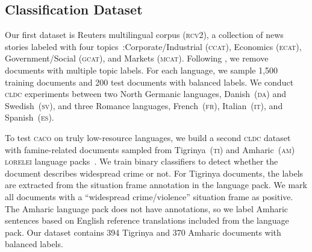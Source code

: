 \documentclass[letterpaper]{article} %
\newcommand{\citet}[1]{\citeauthor{#1} \shortcite{#1}}
\newcommand{\citep}{\cite}
\newcommand{\abr}[1]{\textsc{#1}}
\newcommand{\name}[0]{\textsc{caco}}
\begin{document}
\subsection{Classification Dataset} 

Our first dataset is Reuters multilingual corpus (\abr{rcv2}), a collection of
news stories labeled with four topics~\citep{lewis-04}:Corporate/Industrial
(\abr{ccat}), Economics (\abr{ecat}), Government/Social (\abr{gcat}), and
Markets (\abr{mcat}).
Following \citet{klementiev-12}, we remove documents with multiple topic
labels.  For each language, we sample 1,500 training documents and 200 test
documents with balanced labels.  We conduct \abr{cldc} experiments between two
North Germanic languages, Danish~(\abr{da}) and Swedish~(\abr{sv}), and three
Romance languages, French~(\abr{fr}), Italian~(\abr{it}), and
Spanish~(\abr{es}).

To test \name{} on truly low-resource languages, we build a second \abr{cldc}
dataset with famine-related documents sampled from Tigrinya~(\abr{ti}) and
Amharic~(\abr{am}) \abr{lorelei} language packs~\citep{strassel-16}.
We train binary classifiers to detect whether the document describes widespread
crime or not.  For Tigrinya documents, the labels are extracted from the
situation frame annotation in the language pack.  We mark all documents with a
``widespread crime/violence'' situation frame as positive.  The Amharic
language pack does not have annotations, so we label Amharic sentences
based on English reference translations included from the language pack.
Our dataset contains 394 Tigrinya and 370 Amharic documents with balanced
labels.
\end{document}

